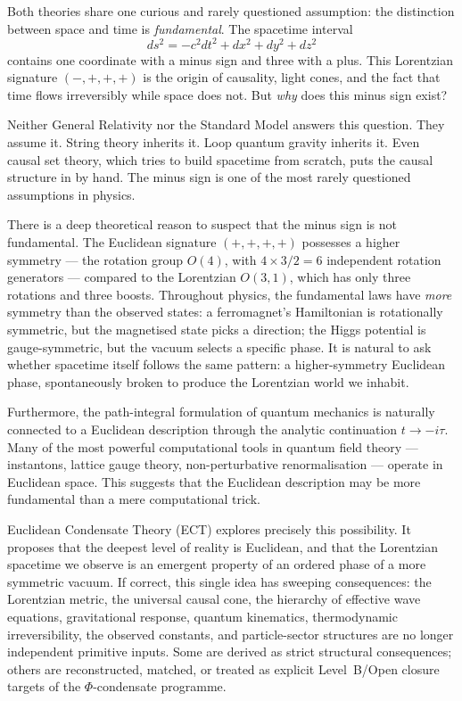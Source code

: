 \documentclass[11pt,a4paper]{article}
\begin{document}
Both theories share one curious and rarely questioned assumption: the distinction between space and time is \emph{fundamental}. The spacetime interval
\begin{equation}
  ds^2 = -c^2 dt^2 + dx^2 + dy^2 + dz^2
  \label{eq:pop_interval}
\end{equation}
contains one coordinate with a minus sign and three with a plus. This Lorentzian signature $(-,+,+,+)$ is the origin of causality, light cones, and the fact that time flows irreversibly while space does not. But \emph{why} does this minus sign exist?

Neither General Relativity nor the Standard Model answers this question. They assume it. String theory inherits it. Loop quantum gravity inherits it. Even causal set theory, which tries to build spacetime from scratch, puts the causal structure in by hand. The minus sign is one of the most rarely questioned assumptions in physics.

There is a deep theoretical reason to suspect that the minus sign is not fundamental. The Euclidean signature $(+,+,+,+)$ possesses a higher symmetry --- the rotation group $O(4)$, with $4\times3/2=6$ independent rotation generators --- compared to the Lorentzian $O(3,1)$, which has only three rotations and three boosts. Throughout physics, the fundamental laws have \emph{more} symmetry than the observed states: a ferromagnet's Hamiltonian is rotationally symmetric, but the magnetised state picks a direction; the Higgs potential is gauge-symmetric, but the vacuum selects a specific phase. It is natural to ask whether spacetime itself follows the same pattern: a higher-symmetry Euclidean phase, spontaneously broken to produce the Lorentzian world we inhabit.

Furthermore, the path-integral formulation of quantum mechanics is naturally connected to a Euclidean description through the analytic continuation $t \to -i\tau$. Many of the most powerful computational tools in quantum field theory --- instantons, lattice gauge theory, non-perturbative renormalisation --- operate in Euclidean space. This suggests that the Euclidean description may be more fundamental than a mere computational trick.

Euclidean Condensate Theory (ECT) explores precisely this possibility. It proposes that the deepest level of reality is Euclidean, and that the Lorentzian spacetime we observe is an emergent property of an ordered phase of a more symmetric vacuum. If correct, this single idea has sweeping consequences: the Lorentzian metric, the universal causal cone, the hierarchy of effective wave equations, gravitational response, quantum kinematics, thermodynamic irreversibility, the observed constants, and particle-sector structures are no longer independent primitive inputs. Some are derived as strict structural consequences; others are reconstructed, matched, or treated as explicit Level~B/Open closure targets of the $\Phi$-condensate programme.
\end{document}
